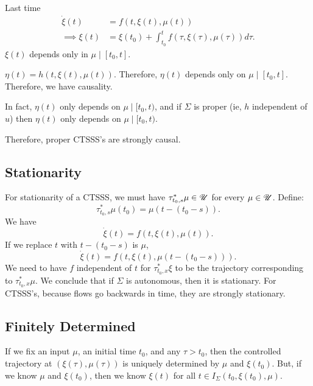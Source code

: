 
Last time
\begin{align*}
	\dot{\xi} \left( t \right) &= f\left( t, \xi\left( t \right) , \mu\left( t \right)  \right)  \\
	\implies \xi\left( t \right) &=  \xi\left( t_0 \right)  + \int_{t_0}^{t} f\left( \tau, \xi\left( \tau \right) , \mu\left( \tau \right)  \right) d \tau
.\end{align*}
$\xi\left( t \right) $ depends only in $\mu \mid \left[ t_0, t \right] $. 

$\eta\left( t \right) = h\left( t, \xi\left( t \right) , \mu\left( t \right)  \right) $. Therefore, $\eta\left( t \right) $ depends only on $\mu \mid \left[ t_0, t \right] $. Therefore, we have causality.

In fact, $\eta\left( t \right) $ only depends on $\mu  \mid [t_0, t )$, and if $\Sigma$ is proper (ie,  $h$ independent of $u$) then $\eta\left( t \right) $ only depends on $\mu \mid [t_0, t)$.

Therefore, proper CTSSS's are strongly causal.

\subsection{Stationarity}

For stationarity of a CTSSS, we must have $\tau_{t_0, s}^{*} \mu \in \mathscr{U}$ for every $\mu \in  \mathscr{U}$. Define:
\[
	\tau^{*}_{t_0, s}\mu\left( t_0 \right)  = \mu\left( t - \left( t_0 - s \right)  \right) 
.\] 
We have 
\[
	\dot{\xi}\left( t \right) = f\left( t, \xi\left( t \right) , \mu\left( t \right)  \right) 
.\] 
If we replace $t$ with $t - \left( t_0 - s \right) $ is $ \mu$, 
\[
	\dot{\xi}\left( t \right) = f\left( t, \xi\left( t \right) , \mu\left( t - \left( t_0 - s \right)  \right)  \right) 
.\] 
We need to have $f$ independent of $t$ for $\tau^{*}_{t_0, x}\xi$ to be the trajectory corresponding to $\tau^{*}_{t_0, x}\mu$. We conclude that if $\Sigma$ is autonomous, then it is stationary. For CTSSS's, because flows go backwards in time, they are strongly stationary.

\subsection{Finitely Determined}

If we fix an input $\mu$, an initial time  $t_0$, and any $\tau> t_0$, then the controlled trajectory at $\left( \xi\left( \tau \right) , \mu\left( \tau \right)  \right) $ is uniquely determined by $\mu$ and $\xi\left( t_0 \right) $. But, if we know $\mu$ and $\xi\left( t_0 \right) $, then we know $\xi\left( t \right) $ for all $t \in I_{\Sigma}\left( t_0, \xi\left( t_0 \right) , \mu \right) $.

